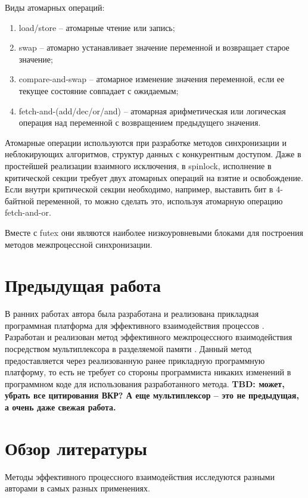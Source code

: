 Виды атомарных операций:
\begin{enumerate}
\item load/store -- атомарные чтение или запись;
\item swap -- атомарно устанавливает значение переменной и возвращает старое значение;
\item compare-and-swap -- атомарное изменение значения переменной, если ее текущее состояние совпадает с ожидаемым;
\item fetch-and-(add/dec/or/and) -- атомарная арифметическая или логическая операция над переменной с возвращением предыдущего значения.
\end{enumerate}

Атомарные операции используются при разработке методов синхронизации и неблокирующих алгоритмов, структур данных с конкурентным доступом. Даже в простейшей реализации взаимного исключения, в spinlock, исполнение в критической секции требует двух атомарных операций на взятие и освобождение. Если внутри критической секции необходимо, например, выставить бит в 4-байтной переменной, то можно сделать это, используя атомарную операцию fetch-and-or. 

Вместе с futex они являются наиболее низкоуровневыми блоками для построения методов межпроцессной синхронизации.

\section{Предыдущая работа}

В ранних работах автора была разработана и реализована прикладная программная платформа для эффективного взаимодействия процессов \cite{GubarevKMU18, GubarevBachelorThesis}. Разработан и реализован метод эффективного межпроцессного взаимодействия посредством мультиплексора в разделяемой памяти \cite{GubarevKMU20}. Данный метод предоставляется через реализованную ранее прикладную программную платформу, то есть не требует со стороны программиста никаких изменений в программном коде для использования разработанного метода.
\textbf{TBD: может, убрать все цитирования ВКР? А еще мультиплексор -- это не предыдущая, а очень даже свежая работа.}

\section{Обзор литературы}

Методы эффективного процессного взаимодействия исследуются разными авторами в самых разных применениях.

